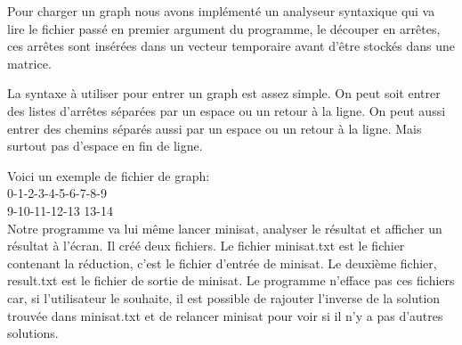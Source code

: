 Pour charger un graph nous avons implémenté un analyseur syntaxique
qui va lire le fichier passé en premier argument du programme, le
découper en arrêtes, ces arrêtes sont insérées dans un vecteur
temporaire avant d'être stockés dans une matrice.

La syntaxe à utiliser pour entrer un graph est assez simple. On peut
soit entrer des listes d'arrêtes séparées par un espace ou un retour à
la ligne. On peut aussi entrer des chemins séparés aussi par un espace
ou un retour à la ligne. Mais surtout pas d'espace en fin de ligne.

Voici un exemple de fichier de graph:\\
0-1-2-3-4-5-6-7-8-9\\
9-10-11-12-13 13-14\\

Notre programme va lui même lancer minisat, analyser le résultat et
afficher un résultat à l'écran. Il créé deux fichiers. Le fichier
minisat.txt est le fichier contenant la réduction, c'est le fichier
d'entrée de minisat. Le deuxième fichier, result.txt est le fichier de
sortie de minisat. Le programme n'efface pas ces fichiers car, si
l'utilisateur le souhaite, il est possible de rajouter l'inverse de la
solution trouvée dans minisat.txt et de relancer minisat pour voir si
il n'y a pas d'autres solutions.
